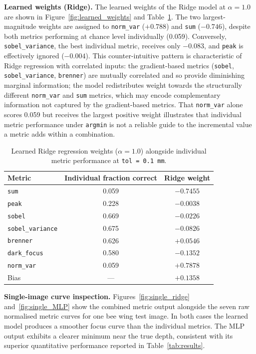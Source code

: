 \documentclass{article}
\begin{document}
\textbf{Learned weights (Ridge).} The learned weights of the Ridge model at $\alpha = 1.0$ are shown in Figure~\ref{fig:learned_weights} and Table~\ref{tab:weights}. The two largest-magnitude weights are assigned to \texttt{norm\_var} ($+0.788$) and \texttt{sum} ($-0.746$), despite both metrics performing at chance level individually (0.059). Conversely, \texttt{sobel\_variance}, the best individual metric, receives only $-0.083$, and \texttt{peak} is effectively ignored ($-0.004$). This counter-intuitive pattern is characteristic of Ridge regression with correlated inputs: the gradient-based metrics (\texttt{sobel}, \texttt{sobel\_variance}, \texttt{brenner}) are mutually correlated and so provide diminishing marginal information; the model redistributes weight towards the structurally different \texttt{norm\_var} and \texttt{sum} metrics, which may encode complementary information not captured by the gradient-based metrics. That \texttt{norm\_var} alone scores 0.059 but receives the largest positive weight illustrates that individual metric performance under \texttt{argmin} is not a reliable guide to the incremental value a metric adds within a combination.

\begin{table}[htbp]
    \centering
    \caption{Learned Ridge regression weights ($\alpha = 1.0$) alongside individual metric performance at \texttt{tol = 0.1\,mm}.}
    \begin{tabular}{lcc}
        \toprule
        Metric & Individual fraction correct & Ridge weight \\
        \midrule
        \texttt{sum}             & 0.059 & $-0.7455$ \\
        \texttt{peak}            & 0.228 & $-0.0038$ \\
        \texttt{sobel}           & 0.669 & $-0.0226$ \\
        \texttt{sobel\_variance} & 0.675 & $-0.0826$ \\
        \texttt{brenner}         & 0.626 & $+0.0546$ \\
        \texttt{dark\_focus}     & 0.580 & $-0.1352$ \\
        \texttt{norm\_var}       & 0.059 & $+0.7878$ \\
        \midrule
        Bias & --- & $+0.1358$ \\
        \bottomrule
    \end{tabular}
    \label{tab:weights}
\end{table}

\textbf{Single-image curve inspection.} Figures~\ref{fig:single_ridge} and~\ref{fig:single_MLP} show the combined metric output alongside the seven raw normalised metric curves for one bee wing test image. In both cases the learned model produces a smoother focus curve than the individual metrics. The MLP output exhibits a clearer minimum near the true depth, consistent with its superior quantitative performance reported in Table~\ref{tab:results}.
\end{document}
